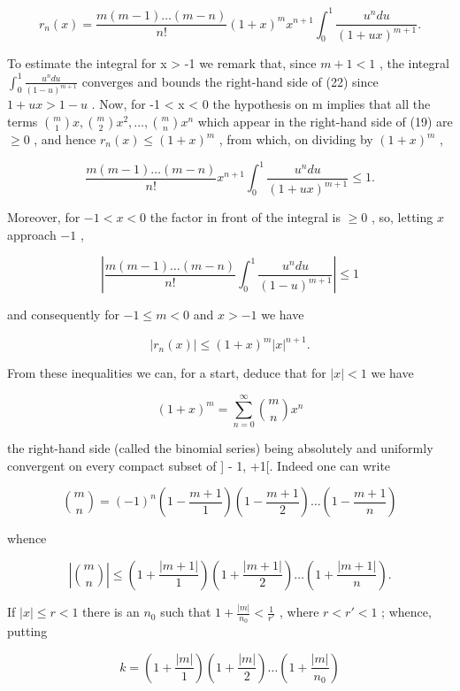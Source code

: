\[
r _ {n} (x) = \frac {m (m - 1) \dots (m - n)}{n !} (1 + x) ^ {m} x ^ {n + 1} \int_ {0} ^ {1} \frac {u ^ {n} d u}{(1 + u x) ^ {m + 1}}.\tag{22}
\]

To estimate the integral for x \textgreater{} -1 we remark that, since \(m + 1 < 1\) , the integral \(\int_{0}^{1}\frac{u^{n}du}{(1-u)^{m+1}}\) converges and bounds the right-hand side of (22) since \(1+ux > 1-u\) . Now, for -1 \textless{} x \textless{} 0 the hypothesis on m implies that all the terms \(\binom{m}{1}x,\binom{m}{2}x^{2},\ldots,\binom{m}{n}x^{n}\) which appear in the right-hand side of (19) are \(\geqslant 0\) , and hence \(r_{n}(x) \leqslant (1+x)^{m}\) , from which, on dividing by \((1+x)^{m}\) ,

\[
\frac {m (m - 1) \dots (m - n)}{n !} x ^ {n + 1} \int_ {0} ^ {1} \frac {u ^ {n} d u}{(1 + u x) ^ {m + 1}} \leqslant 1.
\]

Moreover, for \(-1 < x < 0\) the factor in front of the integral is \(\geqslant 0\) , so, letting \(x\) approach \(-1\) ,

\[
\left| \frac {m (m - 1) \dots (m - n)}{n !} \int_ {0} ^ {1} \frac {u ^ {n} d u}{(1 - u) ^ {m + 1}} \right| \leqslant 1
\]

and consequently for \(-1 \leqslant m < 0\) and \(x > -1\) we have

\[
\left| r _ {n} (x) \right| \leqslant (1 + x) ^ {m} | x | ^ {n + 1}.\tag{23}
\]

From these inequalities we can, for a start, deduce that for \(|x| < 1\) we have

\[
(1 + x) ^ {m} = \sum_ {n = 0} ^ {\infty} \binom {m} {n} x ^ {n}\tag{24}
\]

the right-hand side (called the binomial series) being absolutely and uniformly convergent on every compact subset of {]} - 1, +1{[}. Indeed one can write

\[
\binom {m} {n} = (- 1) ^ {n} \left(1 - \frac {m + 1}{1}\right) \left(1 - \frac {m + 1}{2}\right) \dots \left(1 - \frac {m + 1}{n}\right)\tag{25}
\]

whence

\[
\left| \binom {m} {n} \right| \leqslant \left(1 + \frac {| m + 1 |}{1}\right) \left(1 + \frac {| m + 1 |}{2}\right) \dots \left(1 + \frac {| m + 1 |}{n}\right).
\]

If \(|x| \leqslant r < 1\) there is an \(n_0\) such that \(1 + \frac{|m|}{n_0} < \frac{1}{r'}\) , where \(r < r' < 1\) ; whence, putting

\[
k = \left(1 + \frac {| m |}{1}\right) \left(1 + \frac {| m |}{2}\right) \dots \left(1 + \frac {| m |}{n _ {0}}\right)
\]

